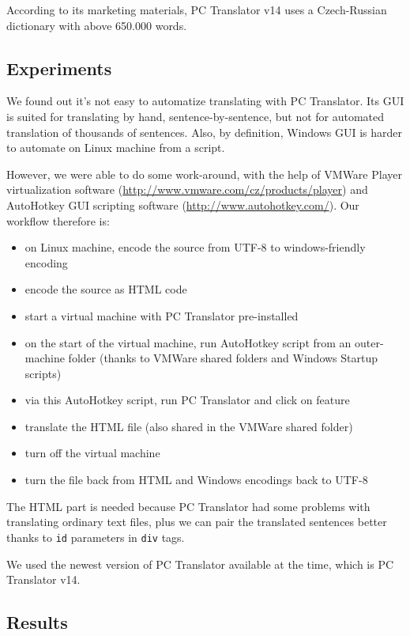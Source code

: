 According to its marketing materials, PC Translator v14 uses a Czech-Russian dictionary with above 650.000 words.

\subsection{Experiments}
We found out it's not easy to automatize translating with PC Translator. Its GUI is suited for translating by hand, sentence-by-sentence, but not for automated translation of thousands of sentences. Also, by definition, Windows GUI is harder to automate on Linux machine from a script.

However, we were able to do some work-around, with the help of VMWare Player virtualization software (\url{http://www.vmware.com/cz/products/player}) and AutoHotkey GUI scripting software (\url{http://www.autohotkey.com/}). Our workflow therefore is:

\begin{itemize}
\item on Linux machine, encode the source from UTF-8 to windows-friendly encoding
\item encode the source as HTML code
\item start a virtual machine with PC Translator pre-installed
\item on the start of the virtual machine, run AutoHotkey script from an outer-machine folder (thanks to VMWare shared folders and Windows Startup scripts)
\item via this AutoHotkey script, run PC Translator and click on  feature 
\item translate the HTML file (also shared in the VMWare shared folder)
\item turn off the virtual machine
\item turn the file back from HTML and Windows encodings back to UTF-8
\end{itemize}

The HTML part is needed because PC Translator had some problems with translating ordinary text files, plus we can pair the translated sentences better thanks to \texttt{id} parameters in \texttt{div} tags.

We used the newest version of PC Translator available at the time, which is PC Translator v14.



\subsection{Results}

